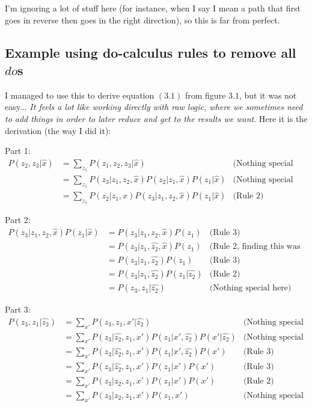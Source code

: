 I'm ignoring a lot of stuff here (for instance, when I say  I mean a path that first goes in reverse then goes in the right direction), so this is far from perfect.

\subsection{Example using do-calculus rules to remove all $do$s}

I managed to use this to derive equation $(3.1)$ from figure $3.1$, but it was not easy... \textit{It feels a lot like working directly with raw logic, where we sometimes need to add things in order to later reduce and get to the results we want}. Here it is the derivation (the way I did it):

Part 1:
\begin{align*}
P(z_2,z_3|\hat{x})&=\sum\limits_{z_1}P(z_1,z_2,z_3|\hat{x})&\text{(Nothing special here)}\\
&=\sum\limits_{z_1}P(z_3|z_1,z_2,\hat{x})P(z_2|z_1,\hat{x})P(z_1|\hat{x})&\text{(Nothing special here)}\\
&=\sum\limits_{z_1}P(z_2|z_1,x)P(z_3|z_1,z_2,\hat{x})P(z_1|\hat{x})&\text{(Rule 2)}
\end{align*}

Part 2:
\begin{align*}
P(z_3|z_1,z_2,\hat{x})P(z_1|\hat{x})&=P(z_3|z_1,z_2,\hat{x})P(z_1)&\text{(Rule 3)}\\
&=P(z_3|z_1,\hat{z_2},\hat{x})P(z_1)&\text{(Rule 2, finding this was hard for me)}\\
&=P(z_3|z_1,\hat{z_2})P(z_1)&\text{(Rule 3)}\\
&=P(z_3|z_1,\hat{z_2})P(z_1|\hat{z_2})&\text{(Rule 2)}\\
&=P(z_3,z_1|\hat{z_2})&\text{(Nothing special here)}
\end{align*}

Part 3:
\begin{align*}
P(z_3,z_1|\hat{z_2})&=\sum\limits_{x'}P(z_3,z_1,x'|\hat{z_2})&\text{(Nothing special here)}\\
&=\sum\limits_{x'}P(z_3|\hat{z_2},z_1,x')P(z_1|x',\hat{z_2})P(x'|\hat{z_2})&\text{(Nothing special here)}\\
&=\sum\limits_{x'}P(z_3|\hat{z_2},z_1,x')P(z_1|x',\hat{z_2})P(x')&\text{(Rule 3)}\\
&=\sum\limits_{x'}P(z_3|\hat{z_2},z_1,x')P(z_1|x')P(x')&\text{(Rule 3)}\\
&=\sum\limits_{x'}P(z_3|z_2,z_1,x')P(z_1|x')P(x')&\text{(Rule 2)}\\
&=\sum\limits_{x'}P(z_3|z_2,z_1,x')P(z_1,x')&\text{(Nothing special here)}
\end{align*}


